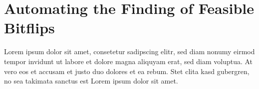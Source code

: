 \section{Automating the Finding of Feasible Bitflips}

Lorem ipsum dolor sit amet, consetetur sadipscing elitr, sed diam nonumy eirmod
tempor invidunt ut labore et dolore magna aliquyam erat, sed diam voluptua. At
vero eos et accusam et justo duo dolores et ea rebum. Stet clita kasd gubergren,
no sea takimata sanctus est Lorem ipsum dolor sit amet.

